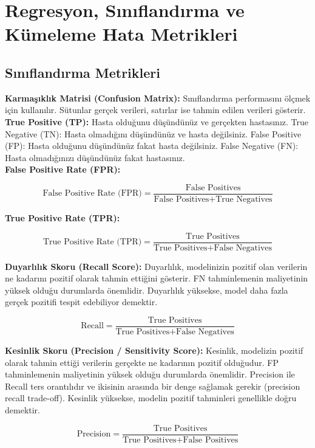 \section{Regresyon, Sınıflandırma ve Kümeleme Hata Metrikleri}

\subsection{Sınıflandırma Metrikleri}

\textbf{Karmaşıklık Matrisi (Confusion Matrix):} Sınıflandırma performasını ölçmek için kullanılır. Sütunlar gerçek verileri, satırlar ise tahmin edilen verileri gösterir. \\

\textbf{True Positive (TP):} Hasta olduğunu düşündünüz ve gerçekten hastasınız. True Negative (TN): Hasta olmadığını düşündünüz ve hasta değilsiniz. False Positive (FP): Hasta olduğunu düşündünüz fakat hasta değilsiniz. False Negative (FN): Hasta olmadığınızı düşündünüz fakat hastasınız. \\

\textbf{False Positive Rate (FPR):} 

\[\text{False Positive Rate (FPR)} = \frac{\text{False Positives}}{\text{False Positives} + \text{True Negatives}}\]

\textbf{True Positive Rate (TPR):}

\[\text{True Positive Rate (TPR)} = \frac{\text{True Positives}}{\text{True Positives} + \text{False Negatives}}\]

\textbf{Duyarlılık Skoru (Recall Score):} Duyarlılık, modelinizin pozitif olan verilerin ne kadarını pozitif olarak tahmin ettiğini gösterir. FN tahminlemenin maliyetinin yüksek olduğu durumlarda önemlidir. Duyarlılık yüksekse, model daha fazla gerçek pozitifi tespit edebiliyor demektir.

\[\text{Recall} = \frac{\text{True Positives}}{\text{True Positives} + \text{False Negatives}}\]

\textbf{Kesinlik Skoru (Precision / Sensitivity Score):} Kesinlik, modelizin pozitif olarak tahmin ettiği verilerin gerçekte ne kadarının pozitif olduğudur. FP tahminlemenin maliyetinin yüksek olduğu durumlarda önemlidir. Precision ile Recall ters orantılıdır ve ikisinin arasında bir denge sağlamak gerekir (precision recall trade-off). Kesinlik yüksekse, modelin pozitif tahminleri genellikle doğru demektir.

\[\text{Precision} = \frac{\text{True Positives}}{\text{True Positives} + \text{False Positives}}\]

